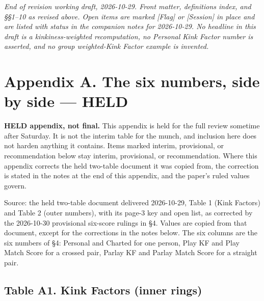 \emph{End of revision working draft, 2026-10-29. Front matter,
definitions index, and \S \S 1--10 as revised above. Open items are marked
{[}Flag{]} or {[}Session{]} in place and are listed with status in the
companion notes for 2026-10-29. No headline in this draft is a
kinkiness-weighted recomputation, no Personal Kink Factor number is
asserted, and no group weighted-Kink Factor example is invented.}

\section{Appendix A. The six numbers, side by side ---
HELD}\label{appendix-a.-the-six-numbers-side-by-side-held}

\textbf{HELD appendix, not final.} This appendix is held for the full
review sometime after Saturday. It is not the interim table for the
munch, and inclusion here does not harden anything it contains. Items
marked interim, provisional, or recommendation below stay interim,
provisional, or recommendation. Where this appendix corrects the held
two-table document it was copied from, the correction is stated in the
notes at the end of this appendix, and the paper's ruled values govern.

Source: the held two-table document delivered 2026-10-29, Table 1 (Kink
Factors) and Table 2 (outer numbers), with its page-3 key and open list,
as corrected by the 2026-10-30 provisional six-score rulings in \S 4.
Values are copied from that document, except for the corrections in the
notes below. The six columns are the six numbers of \S 4: Personal and
Charted for one person, Play KF and Play Match Score for a crossed pair,
Parlay KF and Parlay Match Score for a straight pair.

\subsection{Table A1. Kink Factors (inner
rings)}\label{table-a1.-kink-factors-inner-rings}


